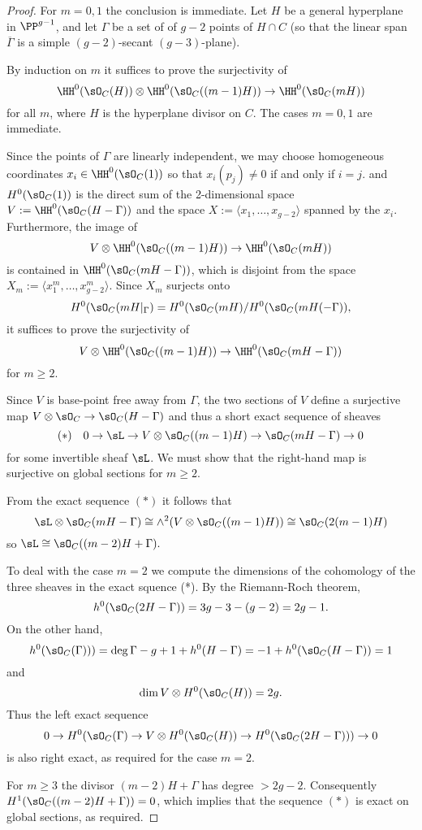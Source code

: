 \begin{proof} 

For $m = 0,1$ the conclusion is immediate. Let $H$ be a general hyperplane in $\PP^{g-1}$, 
and let $\Gamma$ be a set of
 of $g-2$ points of $H\cap C$ (so that the linear span $\overline \Gamma$ is a simple $(g-2)$-secant $(g-3)$-plane).

By induction on $m$ it suffices to prove the surjectivity of
$$
\HH^{0}(\sO_{C}(H)) \otimes \HH^{0}(\sO_{C}((m-1)H)) \to \HH^{0}(\sO_{C}(mH))
$$
for all $m$, where $H$ is the hyperplane divisor on $C$. The cases $m=0,1$ are immediate.

Since the points of $\Gamma$
are linearly independent, we may choose homogeneous coordinates $x_{i} \in \HH^{0}(\sO_{C}(1))$ so that
$x_{i}(p_{j}) \neq 0$ if and only if $i = j$. 
and $H^0(\sO_C(1))$ is the direct sum of the 2-dimensional
space $V:= \HH^{0}(\sO_{C}(H-\Gamma))$ and the space $X := \langle x_1,\dots, x_{g-2}\rangle$ spanned by the $x_i$.
Furthermore, the image of 
$$
V \otimes \HH^{0}(\sO_{C}((m-1)H)) \to \HH^{0}(\sO_{C}(mH))
$$
is contained in $\HH^{0}(\sO_{C}(mH-\Gamma))$, which is disjoint from the space
$X_m:= \langle x_1^m,\dots, x_{g-2}^m\rangle$. Since $X_m$ surjects onto
$$
H^0(\sO_C(mH|_\Gamma) = H^0(\sO_C(mH)/H^0(\sO_C(mH(-\Gamma)),
$$
it suffices to prove the surjectivity of
$$
V \otimes \HH^{0}(\sO_{C}((m-1)H)) \to \HH^{0}(\sO_{C}(mH-\Gamma))
$$
for  $m\geq 2$.


Since $V$ is base-point free away from $\Gamma$, the two sections of $V$
define a surjective map $V\otimes \sO_C \to  \sO_{C}(H-\Gamma)$ and thus a short exact sequence of sheaves
$$
(*) \quad 0\to \sL  \to V\otimes \sO_C((m-1)H) \to  \sO_{C}(mH-\Gamma)\to 0
$$
for some invertible sheaf $\sL$. We must show that the right-hand map is surjective on global sections for $m\geq 2$.

From the exact sequence $(*)$ it follows that
$$
\sL\otimes \sO_{C}(mH-\Gamma) \cong  \wedge^2(V\otimes \sO_C((m-1)H) ) \cong \sO_C(2(m-1)H) 
$$
so $\sL \cong \sO_C((m-2)H+\Gamma).$ 


To deal with the case $m=2$ we compute the dimensions of the cohomology of the three sheaves in the exact squence (*).
By the Riemann-Roch theorem,
$$
h^0(\sO_C(2H-\Gamma)) = 3g-3 - (g-2) = 2g-1.
$$ 
On the other hand,
$$
h^0(\sO_C(\Gamma)))=\deg \Gamma -g+1+h^0(H-\Gamma) = -1 + h^0(\sO_C(H-\Gamma)) = 1
$$
and 
$$
\dim V \otimes H^0(\sO_C(H)) = 2g.
$$
Thus the left exact sequence
$$
0\to H^0(\sO_{C}(\Gamma)  \to V\otimes H^0(\sO_C(H)) \to H^0( \sO_{C}(2H-\Gamma))) \to 0
$$
is also right exact, as required for the case $m=2$.

For $m\geq 3$ the divisor $(m-2)H+\Gamma$ has degree $>2g-2$. Consequently
$H^1(\sO_{C}((m-2)H+\Gamma)) = 0$, which implies that the sequence $(*)$ is
exact on global sections, as required.
\end{proof}

